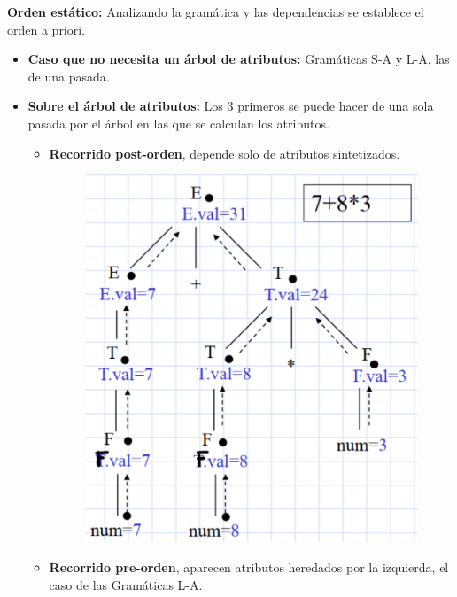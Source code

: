 \documentclass[12pt]{report} %
\begin{document}
\textbf{Orden estático:} Analizando la gramática y las dependencias se establece el orden a priori.
  \begin{itemize}
    \item \textbf{Caso que no necesita un árbol de atributos:} Gramáticas S-A y L-A, las de una pasada.
    \item \textbf{Sobre el árbol de atributos:} Los 3 primeros se puede hacer de una sola pasada por el árbol en las que se calculan los atributos.
    \begin{itemize}
      \item \textbf{Recorrido post-orden}, depende solo de atributos sintetizados.
      \begin{figure}[H]
        {\includegraphics[scale=.25]{2021-05-01 01_50_04-05_resum_Sem_2021.pdf - Foxit Reader.png}}
      \end{figure}
      \item \textbf{Recorrido pre-orden}, aparecen atributos heredados por la izquierda, el caso de las Gramáticas L-A.
      \begin{figure}[H]

\end{figure}
\end{itemize}
\end{itemize}
\end{document}

